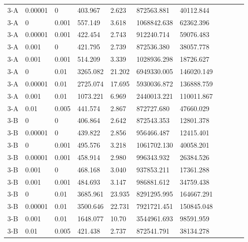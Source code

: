 \documentclass{tamuccthesis}
\begin{document}
\begin{appendices}
\begin{small}
\begin{longtable}{lllllllllll}
    3-A & 0.00001 &     0 & 403.967 & 2.623 &  872563.881 & 40112.844 \\
    3-A &       0 & 0.001 & 557.149 & 3.618 & 1068842.638 & 62362.396 \\
    3-A & 0.00001 & 0.001 & 422.454 & 2.743 &  912240.714 & 59076.483 \\
    3-A & 0.001   &     0 &  421.795 &  2.739 &  872536.380 &  38057.778 \\
    3-A & 0.001   & 0.001 &  514.209 &  3.339 & 1028936.298 &  18726.627 \\
    3-A &     0   &  0.01 & 3265.082 & 21.202 & 6949330.005 & 146020.149 \\
    3-A & 0.00001 &  0.01 & 2725.074 & 17.695 & 5930036.872 & 136888.759 \\
    3-A & 0.001 &  0.01 & 1073.221 & 6.969 & 2440013.221 & 110011.867 \\
    3-A &  0.01 & 0.005 &  441.574 & 2.867 &  872727.680 &  47660.029 \\
    3-B &       0 &     0 & 406.864 & 2.642 &  872543.353 & 12801.378 \\
    3-B & 0.00001 &     0 & 439.822 & 2.856 &  956466.487 & 12415.401 \\
    3-B &       0 & 0.001 & 495.576 & 3.218 & 1061702.130 & 40058.201 \\
    3-B & 0.00001 & 0.001 & 458.914 & 2.980 &  996343.932 & 26384.526 \\
    3-B & 0.001   &     0 &  468.168 &  3.040 &  937853.211 &  17361.288 \\
    3-B & 0.001   & 0.001 &  484.693 &  3.147 &  986881.612 &  34759.438 \\
    3-B &     0   &  0.01 & 3685.961 & 23.935 & 8291295.995 & 164667.291 \\
    3-B & 0.00001 &  0.01 & 3500.646 & 22.731 & 7921721.451 & 150845.048 \\
    3-B & 0.001 &  0.01 & 1648.077 & 10.70 & 3544961.693 & 98591.959 \\
    3-B &  0.01 & 0.005 &  421.438 &  2.737 & 872541.791 & 38134.278 \\   
    
\end{longtable}
\end{small}



\end{appendices}
\end{document}
